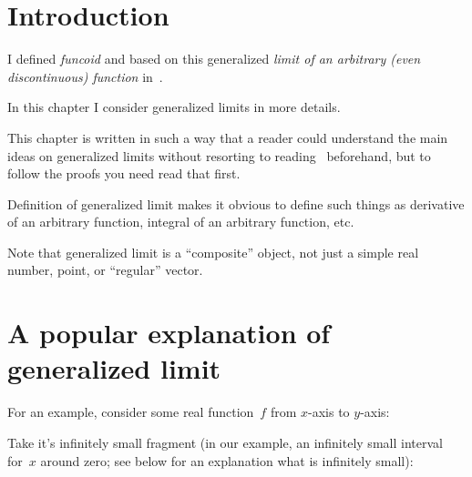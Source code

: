 \chapter{Introduction}

I defined \emph{funcoid} and based on this generalized \emph{limit of an arbitrary (even discontinuous) function} in~\cite{volume-1-edition1}.

In this chapter I consider generalized limits in more details.

This chapter is written in such a way that a reader could understand the main ideas on generalized limits without resorting to reading~\cite{volume-1-edition1} beforehand, but to follow the proofs you need read that first.

Definition of generalized limit makes it obvious to define such things as derivative of an arbitrary function, integral of an arbitrary function, etc.

Note that generalized limit is a ``composite'' object, not just a simple real number, point, or ``regular'' vector.

\chapter{A popular explanation of generalized limit}

For an example, consider some real function~$f$ from $x$-axis to $y$-axis:
\begin{figure}[H]
\end{figure}
 
Take it's infinitely small fragment (in our example, an infinitely small interval for~$x$ around zero; see below for an explanation what is infinitely small):
\begin{figure}[H]
\end{figure}

